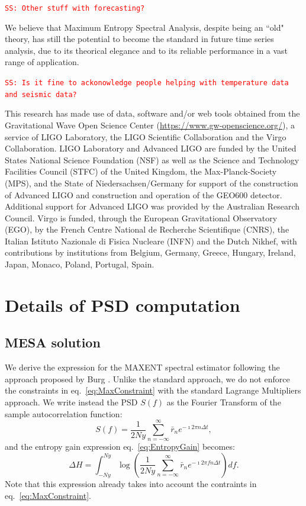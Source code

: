 \documentclass[twocolumn,showpacs,preprintnumbers,nofootinbib,prd,
superscriptaddress,10pt]{revtex4-1}
\newcommand{\sschmidt}[1]{{\textcolor{red}{\texttt{SS: #1}} }}
\begin{document}
\sschmidt{Other stuff with forecasting?}

We believe that Maximum Entropy Spectral Analysis, despite being an ``old" theory, has still the potential to become the standard in future time series analysis, due to its theorical elegance and to its reliable performance in a vast range of application.



	\begin{acknowledgments}
\sschmidt{Is it fine to ackonowledge people helping with temperature data and seismic data?}

This research has made use of data, software and/or web tools obtained from the Gravitational Wave Open Science Center (\url{https://www.gw-openscience.org/}), a service of LIGO Laboratory, the LIGO Scientific Collaboration and the Virgo Collaboration. LIGO Laboratory and Advanced LIGO are funded by the United States National Science Foundation (NSF) as well as the Science and Technology Facilities Council (STFC) of the United Kingdom, the Max-Planck-Society (MPS), and the State of Niedersachsen/Germany for support of the construction of Advanced LIGO and construction and operation of the GEO600 detector. Additional support for Advanced LIGO was provided by the Australian Research Council. Virgo is funded, through the European Gravitational Observatory (EGO), by the French Centre National de Recherche Scientifique (CNRS), the Italian Istituto Nazionale di Fisica Nucleare (INFN) and the Dutch Nikhef, with contributions by institutions from Belgium, Germany, Greece, Hungary, Ireland, Japan, Monaco, Poland, Portugal, Spain.
	\end{acknowledgments}

\pagebreak
\appendix
\section{Details of PSD computation} 
\subsection{MESA solution}\label{sec:MESA_solution}
We derive the expression for the MAXENT spectral estimator following the approach proposed by Burg \cite{burg1975maximum}.
Unlike the standard approach, we do not enforce the constraints in eq.~\eqref{eq:MaxConstraint} with the standard Lagrange Multipliers approach.
We write instead the PSD $S(f)$ as the Fourier Transform of the sample autocorrelation function: 
\begin{equation}
    S(f) = \frac{1}{2 Ny}\sum_{n = -\infty}^{\infty} \bar r_n e^{- \imath 2 \pi n \Delta t},
\end{equation}
and the entropy gain expression eq.~\eqref{eq:EntropyGain} becomes:
\begin{equation}
    \Delta H = \int_{-Ny}^{Ny}  
    \log\left(\frac{1}{2 Ny}\sum_{n = -\infty}^{\infty} \bar r_n e^{-\imath 2 \pi f n \Delta t} 
    \right) df.
\end{equation}
Note that this expression already takes into account the contraints in eq.~\eqref{eq:MaxConstraint}.
\end{document}
